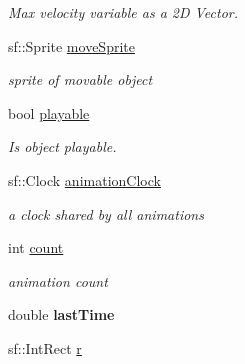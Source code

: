 \begin{DoxyCompactItemize}
\begin{DoxyCompactList}\small\item\em Max velocity variable as a 2\-D Vector. \end{DoxyCompactList}\item 
\hypertarget{class_movable_a33f5b527f0ef2d47360c1c5d5d3b02b4}{sf\-::\-Sprite \hyperlink{class_movable_a33f5b527f0ef2d47360c1c5d5d3b02b4}{move\-Sprite}}\label{class_movable_a33f5b527f0ef2d47360c1c5d5d3b02b4}

\begin{DoxyCompactList}\small\item\em sprite of movable object \end{DoxyCompactList}\item 
\hypertarget{class_movable_a9c521594c4b5d7b4f597a05940839674}{bool \hyperlink{class_movable_a9c521594c4b5d7b4f597a05940839674}{playable}}\label{class_movable_a9c521594c4b5d7b4f597a05940839674}

\begin{DoxyCompactList}\small\item\em Is object playable. \end{DoxyCompactList}\item 
\hypertarget{class_movable_a629fcd93be7b4c904b151d4dcfab28d6}{sf\-::\-Clock \hyperlink{class_movable_a629fcd93be7b4c904b151d4dcfab28d6}{animation\-Clock}}\label{class_movable_a629fcd93be7b4c904b151d4dcfab28d6}

\begin{DoxyCompactList}\small\item\em a clock shared by all animations \end{DoxyCompactList}\item 
\hypertarget{class_movable_a7b884da4aa6fc964a8708b08639c63a8}{int \hyperlink{class_movable_a7b884da4aa6fc964a8708b08639c63a8}{count}}\label{class_movable_a7b884da4aa6fc964a8708b08639c63a8}

\begin{DoxyCompactList}\small\item\em animation count \end{DoxyCompactList}\item 
\hypertarget{class_movable_adcb7431454605451f9b36432d1efc957}{double {\bfseries last\-Time}}\label{class_movable_adcb7431454605451f9b36432d1efc957}

\item 
\hypertarget{class_movable_afe64fcc8c67accc7bdc25370b5c2d90d}{sf\-::\-Int\-Rect \hyperlink{class_movable_afe64fcc8c67accc7bdc25370b5c2d90d}{r}}\label{class_movable_afe64fcc8c67accc7bdc25370b5c2d90d}


\end{DoxyCompactItemize}
